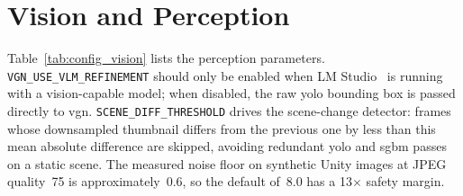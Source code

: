 \documentclass[
     12pt,
     a4paper,
     BCOR=10mm,
     DIV=14,
     listof=totoc,
     bibliography=totoc,
     parskip,
     twoside,
     headsepline
     ]{scrreprt}
\begin{document}
\section{Vision and Perception}\label{appendix:config:vision}
Table~\ref{tab:config_vision} lists the perception parameters. \texttt{VGN\_USE\_VLM\_REFINEMENT} should only be enabled when LM Studio~\cite{lmstudio} is running with a vision-capable model; when disabled, the raw \gls{yolo} bounding box is passed directly to \gls{vgn}. \texttt{SCENE\_DIFF\_THRESHOLD} drives the scene-change detector: frames whose downsampled thumbnail differs from the previous one by less than this mean absolute difference are skipped, avoiding redundant \gls{yolo} and \gls{sgbm} passes on a static scene. The measured noise floor on synthetic Unity images at JPEG quality~75 is approximately~0.6, so the default of~8.0 has a 13$\times$ safety margin.
\end{document}
